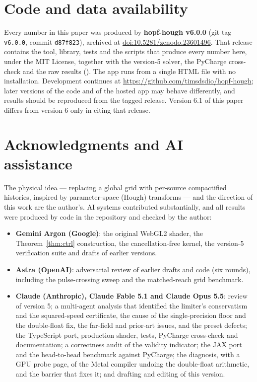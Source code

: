 \documentclass[11pt, a4paper]{article}
\begin{document}
\section{Code and data availability}
Every number in this paper was produced by \textbf{hopf-hough v6.0.0} (git tag \texttt{v6.0.0}, commit \texttt{d87f823}), archived at \href{https://doi.org/10.5281/zenodo.23601496}{doi:10.5281/zenodo.23601496}. That release contains the tool, library, tests and the scripts that produce every number here, under the MIT License, together with the version-5 solver, the PyCharge cross-check and the raw results (). The app runs from a single HTML file with no installation. Development continues at \url{https://github.com/timsdsdio/hopf-hough}; later versions of the code and of the hosted app may behave differently, and results should be reproduced from the tagged release. Version 6.1 of this paper differs from version 6 only in citing that release.

\section*{Acknowledgments and AI assistance}
The physical idea --- replacing a global grid with per-source compactified histories, inspired by parameter-space (Hough) transforms --- and the direction of this work are the author's. AI systems contributed substantially, and all results were produced by code in the repository and checked by the author:
\begin{itemize}
    \item \textbf{Gemini Argon (Google)}:
    the original WebGL2 shader, the Theorem~\ref{thm:ctrl} construction, the cancellation-free kernel, the version-5 verification suite and drafts of earlier versions.
    \item \textbf{Astra (OpenAI)}:
    adversarial review of earlier drafts and code (six rounds), including the pulse-crossing sweep and the matched-reach grid benchmark.
    \item \textbf{Claude (Anthropic), Claude Fable 5.1 and Claude Opus 5.5}: review of version 5; a multi-agent analysis that identified the limiter's conservatism and the squared-speed certificate, the cause of the single-precision floor and the double-float fix, the far-field and prior-art issues, and the preset defects; the TypeScript port, production shader, tests, PyCharge cross-check and documentation; a correctness audit of the validity indicator; the JAX port and the head-to-head benchmark against PyCharge; the diagnosis, with a GPU probe page, of the Metal compiler undoing the double-float arithmetic, and the barrier that fixes it; and drafting and editing of this version.
\end{itemize}
\end{document}

